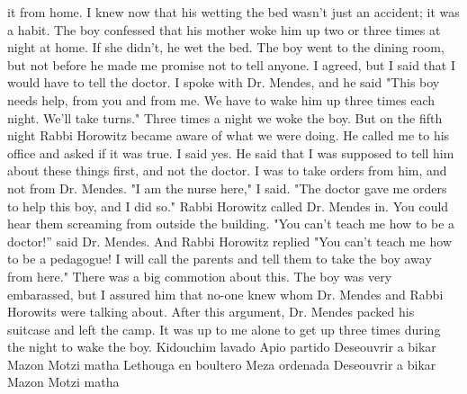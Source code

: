 it from home. I knew now that his wetting the bed wasn't just an accident; it was a 
habit. The boy confessed that his mother woke him up two or three times at night at 
home. If she didn't, he wet the bed. The boy went to the dining room, but not before he 
made me promise not to tell anyone. I agreed, but I said that I would have to tell 
the doctor. 
I spoke with Dr. Mendes, and he said "This boy needs help, from you and from me. 
We have to wake him up three times each night. We'll take turns." Three times a night 
we woke the boy. But on the fifth night Rabbi Horowitz became aware of what we were doing.
He called me to his office and asked if it was true. I said yes. He
said that I was supposed to tell him about these things first, and not the doctor. I
was to take orders from him, and not from Dr. Mendes. 
"I am the nurse here," I said. "The doctor gave me orders to help this boy, and
I did so." 
Rabbi Horowitz called Dr. Mendes in. You could hear them screaming from outside 
the building. 
"You can't teach me how to be a doctor!” said Dr. Mendes. 
And Rabbi Horowitz replied "You can't teach me how to be a pedagogue! I will 
call the parents and tell them to take the boy away from here." 
There was a big commotion about this. The boy was very embarassed, but I assured
him that no-one knew whom Dr. Mendes and Rabbi Horowits were talking about. 
After this argument, Dr. Mendes packed his suitcase and left the camp. It was up 
to me alone to get up three times during the night to wake the boy. 
Kidouchim lavado 
Apio partido 
Deseouvrir a bikar 
Mazon 
Motzi matha 
Lethouga en boultero 
Meza ordenada 
Deseouvrir a bikar 
Mazon 
Motzi matha
